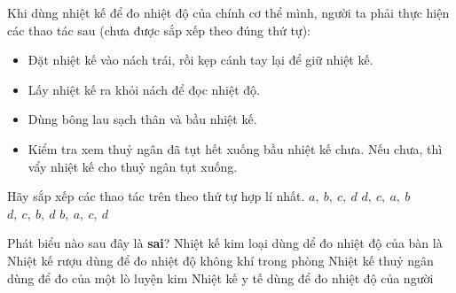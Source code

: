 \begin{ex} 
	Khi dùng nhiệt kế để đo nhiệt độ của chính cơ thể mình, người ta phải thực hiện các thao tác sau (chưa được sắp xếp theo đúng thứ tự):
	\begin{itemize}
		\item [a)] Đặt nhiệt kế vào nách trái, rồi kẹp cánh tay lại để giữ nhiệt kế.
		\item [b)] Lấy nhiệt kế ra khỏi nách để đọc nhiệt độ.
		\item [c)] Dùng bông lau sạch thân và bầu nhiệt kế.
		\item [d)] Kiểm tra xem thuỷ ngân đã tụt hết xuống bầu nhiệt kế chưa. Nếu chưa, thì vẩy nhiệt kế cho thuỷ ngân tụt xuống.
	\end{itemize}
	Hãy sắp xếp các thao tác trên theo thứ tự hợp lí nhất.
	\choice
	{$a,\ b,\ c,\ d$}
	{\True $d,\ c,\ a,\ b$}
	{$d,\ c,\ b,\ d$}
	{$b,\ a,\ c,\ d$}
\end{ex}








\begin{ex} 
	Phát biểu nào sau đây là \textbf{sai}?
	\choice
	{Nhiệt kế kim loại dùng dể đo nhiệt độ của bàn là}
	{Nhiệt kế rượu dùng để đo nhiệt độ không khí trong phòng}
	{\True Nhiệt kế thuỷ ngân dùng để đo của một lò luyện kim}
	{Nhiệt kế y tế dùng để đo nhiệt độ của người}
\end{ex}




















